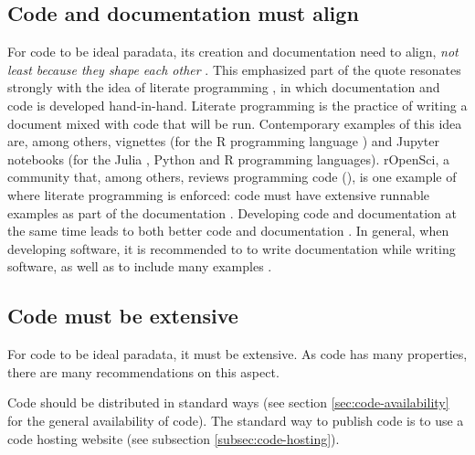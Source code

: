 \subsection{Code and documentation must align}

For code to be ideal paradata, 
its creation and documentation need to align, 
\emph{not least because they shape each other} \cite{huvila2022improving}.
This emphasized part of the quote resonates strongly with the idea of 
literate programming \cite{knuth1984literate},
in which documentation and code is developed hand-in-hand.
Literate programming is the practice of writing a document mixed with code that 
will be run.
Contemporary examples of this idea are, among others, 
vignettes \cite{wickham2015r} (for the R programming language \cite{r}) 
and Jupyter notebooks \cite{wang2020assessing} 
(for the Julia \cite{Julia-2017}, Python \cite{van1995python} and R \cite{r}
programming languages).
rOpenSci, a community that, among others, reviews programming
code (\cite{ram2013ropensci,ram2018community}), is 
one example of where literate programming is enforced:
code must have extensive runnable examples
as part of the documentation \cite{ropensci_2021_6619350}.
Developing code and documentation at the same time 
leads to both better code and documentation \cite{reenskaug1989environment}.
In general, when developing software, 
it is recommended to 
to write documentation while writing software,
as well as to include many examples \cite{lee2018ten}.

\subsection{Code must be extensive}

For code to be ideal paradata, it must be extensive.
As code has many properties, there are many recommendations on this aspect.

Code should be distributed in standard ways \cite{peng2006reproducible}
(see section \ref{sec:code-availability}
for the general availability of code).
The standard way to publish code is to use a code hosting website
(see subsection \ref{subsec:code-hosting}).


